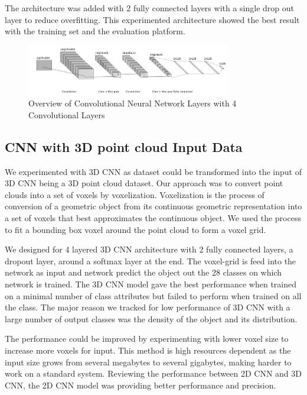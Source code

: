 The architecture was added with 2 fully connected layers with a single drop out layer to reduce overfitting.
This experimented architecture showed the best result with the training set and the evaluation platform.

\begin{figure}[!h]
     \begin{center}
       \includegraphics[width=0.8\textwidth]{./images/object_net.pdf}
       \caption{Overview of Convolutional Neural Network Layers with 4 Convolutional Layers}
       \label{fig:cnn}
     \end{center}
\end{figure}

\subsection{CNN with 3D point cloud Input Data}
We experimented with 3D CNN as dataset could be transformed into the input of 3D CNN being a 3D point cloud dataset. 
Our approach was to convert point clouds into a set of voxels by voxelization. Voxelization is the process of conversion of a geometric object from its continuous geometric representation into a set of voxels that best approximates the continuous
object. We used the process to fit a bounding box voxel around the point cloud to form a voxel grid.

We designed for 4 layered 3D CNN architecture with 2 fully connected layers, a dropout layer, around a softmax layer at the end. 
The voxel-grid is feed into the network as input and network predict the object out the 28 classes on which network is trained. 
The 3D CNN model gave the best performance when trained on a minimal number of class attributes but failed to perform when trained on all the class. 
The major reason we tracked for low performance of 3D CNN with a large number of output classes was the density of the object and its distribution.

The performance could be improved by experimenting with lower voxel size to increase more voxels for input. 
This method is high resources dependent as the input size grows from several megabytes to several gigabytes, making harder to work on a standard system.
Reviewing the performance between 2D CNN and 3D CNN, the 2D CNN model was providing better performance and precision.
